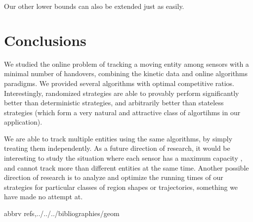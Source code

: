 \documentclass[runningheads]{llncs}
\begin{document}
Our other lower bounds can also be extended just as easily.



















\section {Conclusions}

  We studied the online problem of tracking a moving entity among sensors with a minimal number of handovers, combining the kinetic data and online algorithms paradigms.
  We provided several algorithms with optimal competitive ratios. Interestingly, randomized strategies are able to provably perform significantly better than deterministic strategies, and arbitrarily better than stateless strategies (which form a very natural and attractive class of algortihms in our application).
  
  We are able to track multiple entities using the same algorithms, by simply treating them independently. As a future direction of research, it would be interesting to study the situation where each sensor has a maximum capacity , and cannot track more than  different entities at the same time.
  Another possible direction of research is to analyze and optimize the running times of our strategies for particular classes of region shapes or trajectories, something we have made no attempt at.


{\small\raggedright
 {abbrv}
 {refs,../../../bibliographies/geom}
}
\end{document}
